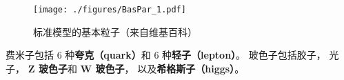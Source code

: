 
\begin{issues}
\issueDraft
\end{issues}

\begin{figure}[ht]
\centering
\texttt{[image: ./figures/BasPar\_1.pdf]}
\caption{标准模型的基本粒子（来自维基百科）} \label{BasPar_fig1}
\end{figure}

费米子包括 6 种\textbf{夸克（quark）}和 6 种\textbf{轻子（lepton）}。 玻色子包括胶子， 光子， \textbf{Z 玻色子}和 \textbf{W 玻色子}， 以及\textbf{希格斯子（higgs）}。
